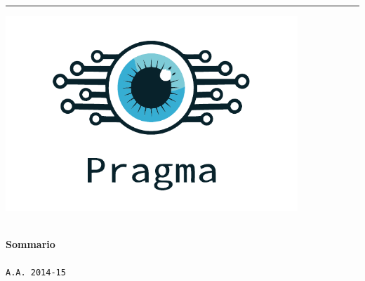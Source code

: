 \begin{titlepage}
	\begin{center}
     {\Huge \textsc{\progetto}}\\
     \vspace{1em} 
		 \hrule
		 \vspace{4em}
     \includegraphics[width=11cm]{../template/icone/logo.pdf}\\
		 \vspace{4em}
     {\huge \textbf{\documenttitle}}\\
     \vspace{2em}

	\end{center}
	

	\vspace{0.5em}
	\begin{center}
		{\large \textbf{Sommario}}\\
	    
	    \vspace{1em}\\
		\texttt{A.A. 2014-15}\\
		\groupmail
	\end{center}

\end{titlepage}